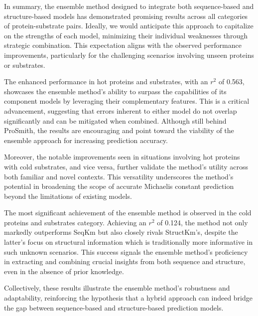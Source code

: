 In summary, the ensemble method designed to integrate both sequence-based and structure-based models has demonstrated promising results across all categories of protein-substrate pairs. Ideally, we would anticipate this approach to capitalize on the strengths of each model, minimizing their individual weaknesses through strategic combination. This expectation aligns with the observed performance improvements, particularly for the challenging scenarios involving unseen proteins or substrates.

The enhanced performance in hot proteins and substrates, with an $r^2$ of 0.563, showcases the ensemble method's ability to surpass the capabilities of its component models by leveraging their complementary features. This is a critical advancement, suggesting that errors inherent to either model do not overlap significantly and can be mitigated when combined. Although still behind ProSmith, the results are encouraging and point toward the viability of the ensemble approach for increasing prediction accuracy.

Moreover, the notable improvements seen in situations involving hot proteins with cold substrates, and vice versa, further validate the method's utility across both familiar and novel contexts. This versatility underscores the method's potential in broadening the scope of accurate Michaelis constant prediction beyond the limitations of existing models.

The most significant achievement of the ensemble method is observed in the cold proteins and substrates category. Achieving an $r^2$ of 0.124, the method not only markedly outperforms SeqKm but also closely rivals StructKm's, despite the latter's focus on structural information which is traditionally more informative in such unknown scenarios. This success signals the ensemble method's proficiency in extracting and combining crucial insights from both sequence and structure, even in the absence of prior knowledge.

Collectively, these results illustrate the ensemble method's robustness and adaptability, reinforcing the hypothesis that a hybrid approach can indeed bridge the gap between sequence-based and structure-based prediction models. 